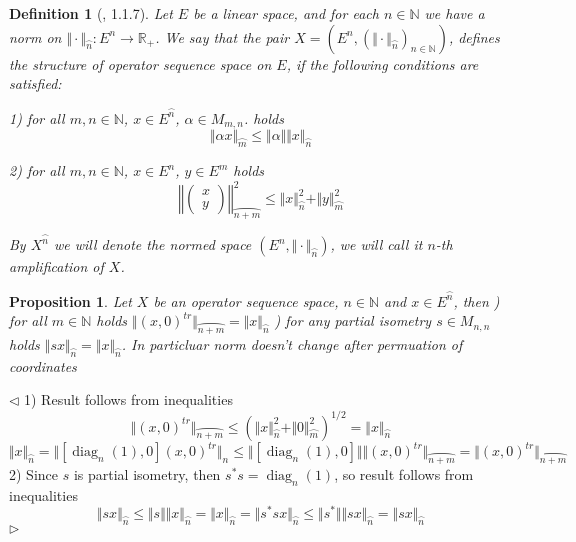\documentclass[12pt]{article}
\newtheorem{proposition}[theorem]{Proposition}
\newtheorem{definition}[theorem]{Definition}
\newenvironment{proof}{\par $\triangleleft$}{$\triangleright$}
\begin{document}
\begin{definition}[\cite{LamOpFolgen}, 1.1.7]\label{DefSQSpace} 
Let $E$ be a linear space, and for each $n\in\mathbb{N}$ we have a norm on $\Vert \cdot \Vert_{\wideparen{n}}:E^n\to\mathbb{R}_+$. 
We say that the pair $X = (E^n, (\Vert \cdot \Vert_{\wideparen{n}})_{n \in \mathbb{N}})$, defines the structure of \textit{operator sequence} space on $E$, if the following conditions are satisfied:

1) for all $m, n \in \mathbb{N}$, $x \in E^{\wideparen{n}}$, $\alpha \in M_{m, n}$. holds
$$
\Vert \alpha x \Vert_{\wideparen{m}} \leq \Vert \alpha \Vert  \Vert x \Vert_{\wideparen{n}}
$$

2) for all $m, n \in \mathbb{N}$, $x \in E^n$, $y \in E^m$ holds
$$
\left\Vert \begin{pmatrix} x \\ y \end{pmatrix} \right\Vert^2_{\wideparen{n + m}} \leq   \Vert x \Vert_{\wideparen{n}}^2 + \Vert y \Vert_{\wideparen{m}}^2
$$

By $X^{\wideparen{n}}$ we will denote the normed space $(E^n,\Vert \cdot \Vert_{\wideparen{n}})$, we will call it $n$-th amplification of $X$.
\end{definition}

\begin{proposition}\label{PrRedundantAxiom} Let $X$ be an operator sequence space, $n\in\mathbb{N}$ and $x\in E^{\wideparen{n}}$, then
) for all $m\in\mathbb{N}$ holds $\Vert (x, 0)^{tr}\Vert_{\wideparen{n + m}}=\Vert x\Vert_{\wideparen{n}}$
) for any partial isometry $s\in M_{n,n}$ holds $\Vert sx\Vert_{\wideparen{n}}=\Vert x\Vert_{\wideparen{n}}$. In particluar norm doesn't change after permuation of coordinates
\end{proposition}
\begin{proof} 1) Result follows from inequalities
$$
\Vert (x, 0)^{tr}\Vert_{\wideparen{n + m}}\leq \left(\Vert x\Vert_{\wideparen{n}}^2+\Vert 0\Vert_{\wideparen{m}}^2\right)^{1/2}=\Vert x\Vert_{\wideparen{n}}
$$
$$
\Vert x\Vert_{\wideparen{n}}=\Vert[\operatorname{diag}_n(1),0](x,0)^{tr}\Vert_{n}\leq\Vert[\operatorname{diag}_n(1),0]\Vert\Vert(x,0)^{tr}\Vert_{\wideparen{n+m}}=
\Vert(x,0)^{tr}\Vert_{\wideparen{n+m}}
$$
2) Since $s$ is partial isometry, then $s^*s=\operatorname{diag}_n(1)$, so result follows from inequalities
$$
\Vert sx\Vert_{\wideparen{n}}\leq\Vert s\Vert\Vert x\Vert_{\wideparen{n}}=\Vert x\Vert_{\wideparen{n}}=
\Vert s^*sx\Vert_{\wideparen{n}}\leq\Vert s^*\Vert\Vert sx\Vert_{\wideparen{n}}=\Vert sx\Vert_{\wideparen{n}}
$$
\end{proof}
\end{document}
